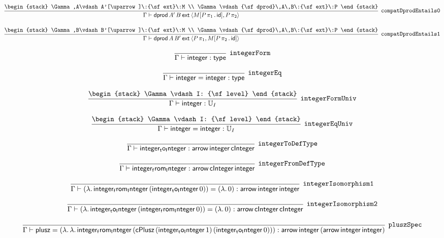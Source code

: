 \[
\infer[{\tt compatDprodEntails0}]{\Gamma \vdash {\sf dprod}\,A'\,B\:{\sf ext}\:\langle M[P\, \pi_1\,.\,{\sf id}],P\, \pi_2\rangle }{
\begin{stack}
\Gamma ,A\vdash A'[\uparrow ]\:{\sf ext}\:M
\\
\Gamma \vdash {\sf dprod}\,A\,B\:{\sf ext}\:P
\end{stack}}
\]

\[
\infer[{\tt compatDprodEntails1}]{\Gamma \vdash {\sf dprod}\,A\,B'\:{\sf ext}\:\langle P\, \pi_1,M[P\, \pi_2\,.\,{\sf id}]\rangle }{
\begin{stack}
\Gamma ,B\vdash B'[\uparrow ]\:{\sf ext}\:M
\\
\Gamma \vdash {\sf dprod}\,A\,B\:{\sf ext}\:P
\end{stack}}
\]

\[
\infer[{\tt integerForm}]{\Gamma \vdash {\sf integer}: {\sf type}}{}
\]

\[
\infer[{\tt integerEq}]{\Gamma \vdash {\sf integer}= {\sf integer}: {\sf type}}{}
\]

\[
\infer[{\tt integerFormUniv}]{\Gamma \vdash {\sf integer}: {\Bbb U}_{I}}{
\begin{stack}
\Gamma \vdash I: {\sf level}
\end{stack}}
\]

\[
\infer[{\tt integerEqUniv}]{\Gamma \vdash {\sf integer}= {\sf integer}: {\Bbb U}_{I}}{
\begin{stack}
\Gamma \vdash I: {\sf level}
\end{stack}}
\]

\[
\infer[{\tt integerToDefType}]{\Gamma \vdash {\sf integer_to_Integer}: {\sf arrow}\,{\sf integer}\,{\sf cInteger}}{}
\]

\[
\infer[{\tt integerFromDefType}]{\Gamma \vdash {\sf integer_from_Integer}: {\sf arrow}\,{\sf cInteger}\,{\sf integer}}{}
\]

\[
\infer[{\tt integerIsomorphism1}]{\Gamma \vdash (\lambda .\,{\sf integer_from_Integer}\,({\sf integer_to_Integer}\,0))= (\lambda .\,0): {\sf arrow}\,{\sf integer}\,{\sf integer}}{}
\]

\[
\infer[{\tt integerIsomorphism2}]{\Gamma \vdash (\lambda .\,{\sf integer_to_Integer}\,({\sf integer_from_Integer}\,0))= (\lambda .\,0): {\sf arrow}\,{\sf cInteger}\,{\sf cInteger}}{}
\]

\[
\infer[{\tt pluszSpec}]{\Gamma \vdash {\sf plusz}= (\lambda .\,\lambda .\,{\sf integer_from_Integer}\,({\sf cPlusz}\,({\sf integer_to_Integer}\,1)\,({\sf integer_to_Integer}\,0))): {\sf arrow}\,{\sf integer}\,({\sf arrow}\,{\sf integer}\,{\sf integer})}{}
\]

